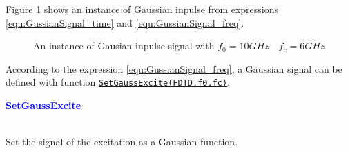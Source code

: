 Figure \ref{fig:GaussInpulseTheory} shows an instance of Gaussian inpulse from expressions \ref{equ:GussianSignal_time} and \ref{equ:GussianSignal_freq}. 
    \begin{figure}[ht]
	      \centering
	      \qquad
	      \qquad 
	      \qquad 
	      \caption[Gausian inpulse signal]{An instance of Gausian inpulse signal with $f_0=10GHz \quad f_c=6GHz$}
	      \label{fig:GaussInpulseTheory}
    \end{figure}
According to the expression \ref{equ:GussianSignal_freq}, a Gaussian signal can be defined with function \hyperref[func:SetGaussExcite]{\texttt{SetGaussExcite(FDTD,f0,fc)}}.

\textcolor{blue}{\begin{large}\textbf{SetGaussExcite}	\end{large}} \label{func:SetGaussExcite}\\
	  Set the signal of the excitation as a Gaussian function.

